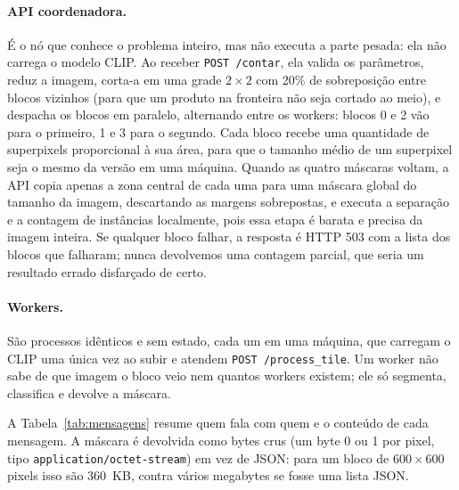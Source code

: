 \documentclass{sbc2023}
\begin{document}
\paragraph{API coordenadora.} É o nó que conhece o problema inteiro, mas não executa a parte pesada: ela não carrega o modelo CLIP. Ao receber \texttt{POST /contar}, ela valida os parâmetros, reduz a imagem, corta-a em uma grade $2\times2$ com 20\% de sobreposição entre blocos vizinhos (para que um produto na fronteira não seja cortado ao meio), e despacha os blocos em paralelo, alternando entre os workers: blocos 0 e 2 vão para o primeiro, 1 e 3 para o segundo. Cada bloco recebe uma quantidade de superpixels proporcional à sua área, para que o tamanho médio de um superpixel seja o mesmo da versão em uma máquina. Quando as quatro máscaras voltam, a API copia apenas a zona central de cada uma para uma máscara global do tamanho da imagem, descartando as margens sobrepostas, e executa a separação e a contagem de instâncias localmente, pois essa etapa é barata e precisa da imagem inteira. Se qualquer bloco falhar, a resposta é HTTP 503 com a lista dos blocos que falharam; nunca devolvemos uma contagem parcial, que seria um resultado errado disfarçado de certo.

\paragraph{Workers.} São processos idênticos e sem estado, cada um em uma máquina, que carregam o CLIP uma única vez ao subir e atendem \texttt{POST /process\_tile}. Um worker não sabe de que imagem o bloco veio nem quantos workers existem; ele só segmenta, classifica e devolve a máscara.

A Tabela~\ref{tab:mensagens} resume quem fala com quem e o conteúdo de cada mensagem. A máscara é devolvida como bytes crus (um byte 0 ou 1 por pixel, tipo \texttt{application/octet-stream}) em vez de JSON: para um bloco de $600\times600$ pixels isso são 360~KB, contra vários megabytes se fosse uma lista JSON.
\end{document}
